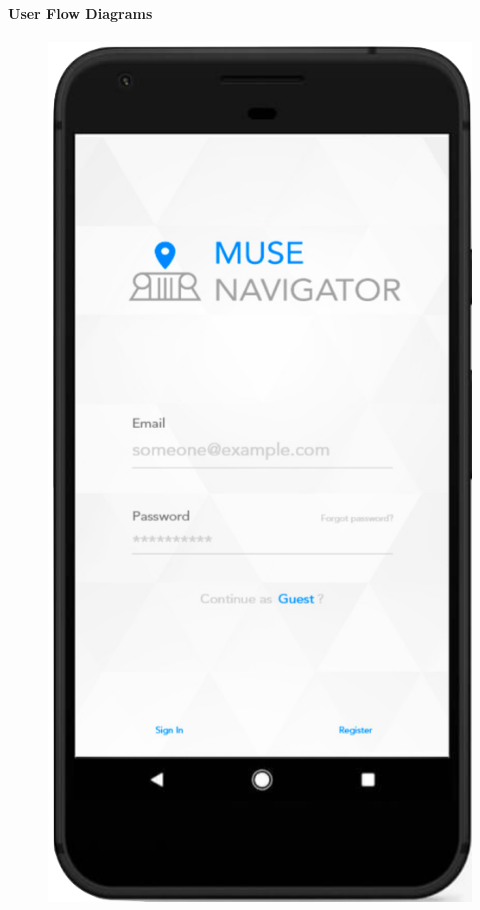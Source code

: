 \documentclass[compress]{beamer}
\begin{document}
    \begin{frame}
		\framesubtitle{User Flow Diagrams}
        \begin{figure}[!htb]
              \includegraphics[width=\linewidth]{1.png}

\end{figure}
\end{frame}
\end{document}
